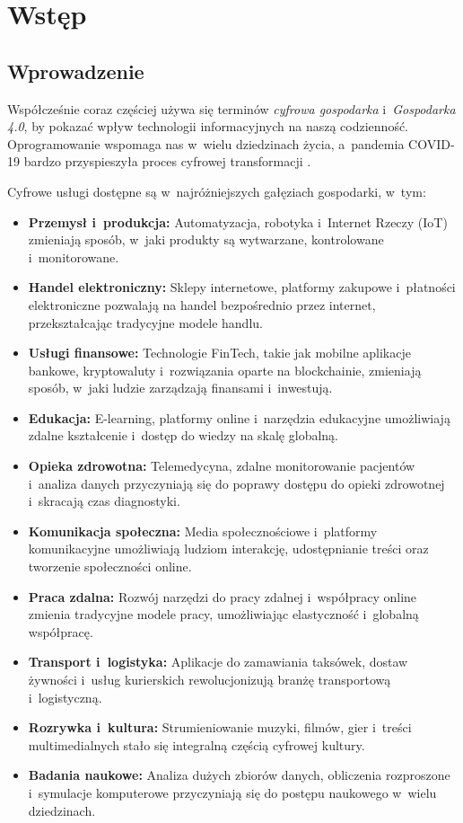 \newpage
\section{Wstęp}
\subsection{Wprowadzenie}
Współcześnie coraz częściej używa się terminów \textit{cyfrowa gospodarka} i~\textit{Gospodarka 4.0}, by pokazać wpływ technologii informacyjnych na naszą codzienność. Oprogramowanie wspomaga nas w~wielu dziedzinach życia, a~pandemia COVID-19 bardzo przyspieszyła proces cyfrowej transformacji \cite{Sledziewska2021DigitalTransformation,Grande2024DevOpsGlobalSoftware}.

\noindent Cyfrowe usługi dostępne są w~najróżniejszych gałęziach gospodarki, w~tym:
\begin{itemize}
    \item \textbf{Przemysł i~produkcja:} Automatyzacja, robotyka i~Internet Rzeczy (IoT) zmieniają sposób, w~jaki produkty są wytwarzane, kontrolowane i~monitorowane.
    \item \textbf{Handel elektroniczny:} Sklepy internetowe, platformy zakupowe i~płatności elektroniczne pozwalają na handel bezpośrednio przez internet, przekształcając tradycyjne modele handlu.
    \item \textbf{Usługi finansowe:} Technologie FinTech, takie jak mobilne aplikacje bankowe, kryptowaluty i~rozwiązania oparte na blockchainie, zmieniają sposób, w~jaki ludzie zarządzają finansami i~inwestują.
    \item \textbf{Edukacja:} E-learning, platformy online i~narzędzia edukacyjne umożliwiają zdalne kształcenie i~dostęp do wiedzy na skalę globalną.
    \item \textbf{Opieka zdrowotna:} Telemedycyna, zdalne monitorowanie pacjentów i~analiza danych przyczyniają się do poprawy dostępu do opieki zdrowotnej i~skracają czas diagnostyki.
    \item \textbf{Komunikacja społeczna:} Media społecznościowe i~platformy komunikacyjne umożliwiają ludziom interakcję, udostępnianie treści oraz tworzenie społeczności online.
    \item \textbf{Praca zdalna:} Rozwój narzędzi do pracy zdalnej i~współpracy online zmienia tradycyjne modele pracy, umożliwiając elastyczność i~globalną współpracę.
    \item \textbf{Transport i~logistyka:} Aplikacje do zamawiania taksówek, dostaw żywności i~usług kurierskich rewolucjonizują branżę transportową i~logistyczną.
    \item \textbf{Rozrywka i~kultura:} Strumieniowanie muzyki, filmów, gier i~treści multimedialnych stało się integralną częścią cyfrowej kultury.
    \item \textbf{Badania naukowe:} Analiza dużych zbiorów danych, obliczenia rozproszone i~symulacje komputerowe przyczyniają się do postępu naukowego w~wielu dziedzinach.
\end{itemize}
